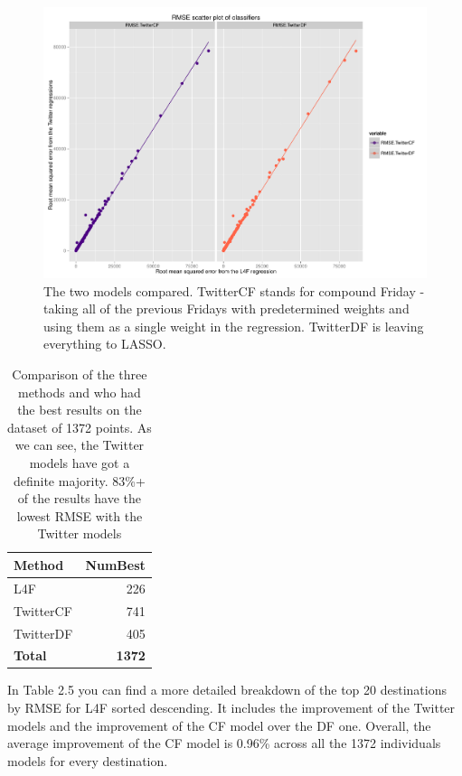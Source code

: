 \documentclass[minf,frontabs,twoside,singlespacing,parskip]{infthesis}
\begin{document}
\begin{figure}[h!]
\begin{center}
\includegraphics[scale=0.4]{rmse_scatter_by_reg}
\end{center}
\caption{The two models compared. TwitterCF stands for compound Friday - taking all of the previous Fridays with predetermined weights and using them as a single weight in the regression. TwitterDF is leaving everything to LASSO.}
\end{figure}

\begin{table}[h!]
\begin{center}
\begin{tabular}{ l | r }
Method & NumBest \\
\hline
L4F & 226 \\
TwitterCF & 741 \\
TwitterDF & 405 \\
\hline
\textbf{Total} & \textbf{1372}
\end{tabular}
\end{center}
\caption{Comparison of the three methods and who had the best results on the dataset of 1372 points. As we can see, the Twitter models have got a definite majority. 83\%+ of the results have the lowest RMSE with the Twitter models}
\end{table}

In Table 2.5 you can find a more detailed breakdown of the top 20 destinations by RMSE for L4F sorted descending. It includes the improvement of the Twitter models and the improvement of the CF model over the DF one. Overall, the average improvement of the CF model is 0.96\% across all the 1372 individuals models for every destination.
\end{document}
